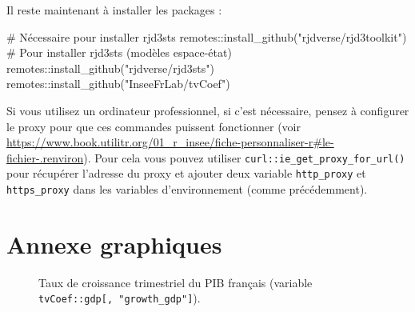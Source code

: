 \documentclass[
  a4paper,
  DIV=11,
  numbers=noendperiod,
  french]{scrartcl}
\newenvironment{Shaded}{\begin{snugshade}}{\end{snugshade}}
\newcommand{\CommentTok}[1]{\textcolor[rgb]{0.37,0.37,0.37}{#1}}
\newcommand{\FunctionTok}[1]{\textcolor[rgb]{0.28,0.35,0.67}{#1}}
\newcommand{\NormalTok}[1]{\textcolor[rgb]{0.00,0.23,0.31}{#1}}
\newcommand{\SpecialCharTok}[1]{\textcolor[rgb]{0.37,0.37,0.37}{#1}}
\newcommand{\StringTok}[1]{\textcolor[rgb]{0.13,0.47,0.30}{#1}}
\newcommand\1{{\mathds 1}}
\theoremstyle{remark}
\begin{document}
Il reste maintenant à installer les packages :

\begin{Shaded}
\begin{Highlighting}[]
\CommentTok{\# Nécessaire pour installer rjd3sts}
\NormalTok{remotes}\SpecialCharTok{::}\FunctionTok{install\_github}\NormalTok{(}\StringTok{"rjdverse/rjd3toolkit"}\NormalTok{)}
\CommentTok{\# Pour installer rjd3sts (modèles espace{-}état)}
\NormalTok{remotes}\SpecialCharTok{::}\FunctionTok{install\_github}\NormalTok{(}\StringTok{"rjdverse/rjd3sts"}\NormalTok{)}
\NormalTok{remotes}\SpecialCharTok{::}\FunctionTok{install\_github}\NormalTok{(}\StringTok{"InseeFrLab/tvCoef"}\NormalTok{)}
\end{Highlighting}
\end{Shaded}

Si vous utilisez un ordinateur professionnel, si c'est nécessaire,
pensez à configurer le proxy pour que ces commandes puissent fonctionner
(voir
\url{https://www.book.utilitr.org/01_r_insee/fiche-personnaliser-r\#le-fichier-.renviron}).
Pour cela vous pouvez utiliser \texttt{curl::ie\_get\_proxy\_for\_url()}
pour récupérer l'adresse du proxy et ajouter deux variable
\texttt{http\_proxy} et \texttt{https\_proxy} dans les variables
d'environnement (comme précédemment).

\newpage

\section{Annexe graphiques}\label{sec-an-graph}

\begin{figure}

\caption{\label{fig-graph-pib}Taux de croissance trimestriel du PIB
français (variable \texttt{tvCoef::gdp{[},\ "growth\_gdp"{]}}).}


\end{figure}%
\end{document}
